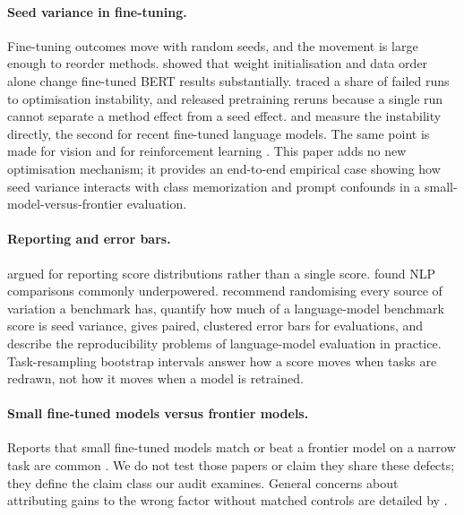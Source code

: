\documentclass[11pt]{article}
\begin{document}
\paragraph{Seed variance in fine-tuning.} Fine-tuning outcomes move with random seeds, and the movement is large enough to reorder methods. \citet{dodge2020finetuning} showed that weight initialisation and data order alone change fine-tuned BERT results substantially. \citet{mosbach2020stability} traced a share of failed runs to optimisation instability, and \citet{sellam2021multiberts} released pretraining reruns because a single run cannot separate a method effect from a seed effect. \citet{du2023instability} and \citet{bui2025seeds} measure the instability directly, the second for recent fine-tuned language models. The same point is made for vision \citep{picard2021seed} and for reinforcement learning \citep{henderson2017rl,agarwal2021precipice}. This paper adds no new optimisation mechanism; it provides an end-to-end empirical case showing how seed variance interacts with class memorization and prompt confounds in a small-model-versus-frontier evaluation.

\paragraph{Reporting and error bars.} \citet{reimers2017distributions} argued for reporting score distributions rather than a single score. \citet{card2020power} found NLP comparisons commonly underpowered. \citet{bouthillier2021variance} recommend randomising every source of variation a benchmark has, \citet{madaan2024variance} quantify how much of a language-model benchmark score is seed variance, \citet{miller2024errorbars} gives paired, clustered error bars for evaluations, and \citet{biderman2024trenches} describe the reproducibility problems of language-model evaluation in practice. Task-resampling bootstrap intervals answer how a score moves when tasks are redrawn, not how it moves when a model is retrained.

\paragraph{Small fine-tuned models versus frontier models.} Reports that small fine-tuned models match or beat a frontier model on a narrow task are common \citep{zhao2024loraland,carammia2024rethinking}. We do not test those papers or claim they share these defects; they define the claim class our audit examines. General concerns about attributing gains to the wrong factor without matched controls are detailed by \citet{lipton2018troubling}.
\end{document}
